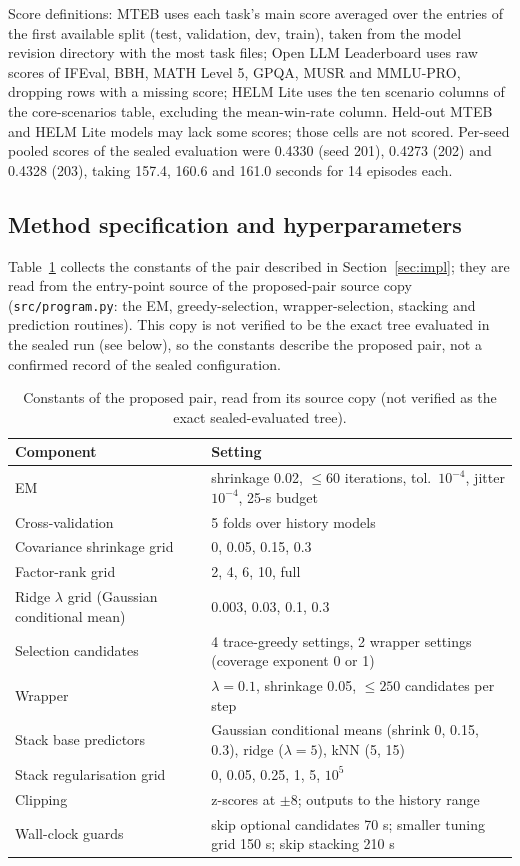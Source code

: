\documentclass{article}
\begin{document}
\noindent Score definitions: MTEB uses each task's main score averaged over the entries of the first available split (test, validation, dev, train), taken from the model revision directory with the most task files; Open LLM Leaderboard uses raw scores of IFEval, BBH, MATH Level 5, GPQA, MUSR and MMLU-PRO, dropping rows with a missing score; HELM Lite uses the ten scenario columns of the core-scenarios table, excluding the mean-win-rate column. Held-out MTEB and HELM Lite models may lack some scores; those cells are not scored. Per-seed pooled scores of the sealed evaluation were 0.4330 (seed 201), 0.4273 (202) and 0.4328 (203), taking 157.4, 160.6 and 161.0 seconds for 14 episodes each. %

\subsection{Method specification and hyperparameters}
Table~\ref{tab:hyper} collects the constants of the pair described in Section~\ref{sec:impl}; they are read from the entry-point source of the proposed-pair source copy (\texttt{src/program.py}: the EM, greedy-selection, wrapper-selection, stacking and prediction routines). This copy is not verified to be the exact tree evaluated in the sealed run (see below), so the constants describe the proposed pair, not a confirmed record of the sealed configuration. %

\begin{table}[h]
\centering
\caption{Constants of the proposed pair, read from its source copy (not verified as the exact sealed-evaluated tree).}
\label{tab:hyper}
\small
\begin{tabular}{lp{}}
\toprule
Component & Setting\\
\midrule
EM & shrinkage 0.02, $\le 60$ iterations, tol.\ $10^{-4}$, jitter $10^{-4}$, 25-s budget\\
Cross-validation & 5 folds over history models\\
Covariance shrinkage grid & 0, 0.05, 0.15, 0.3\\
Factor-rank grid & 2, 4, 6, 10, full\\
Ridge $\lambda$ grid (Gaussian conditional mean) & 0.003, 0.03, 0.1, 0.3\\
Selection candidates & 4 trace-greedy settings, 2 wrapper settings (coverage exponent 0 or 1)\\
Wrapper & $\lambda=0.1$, shrinkage 0.05, $\le 250$ candidates per step\\
Stack base predictors & Gaussian conditional means (shrink 0, 0.15, 0.3), ridge ($\lambda=5$), kNN (5, 15)\\
Stack regularisation grid & 0, 0.05, 0.25, 1, 5, $10^{5}$\\
Clipping & z-scores at $\pm 8$; outputs to the history range\\
Wall-clock guards & skip optional candidates 70 s; smaller tuning grid 150 s; skip stacking 210 s\\
\bottomrule
\end{tabular}
\end{table}
\end{document}

